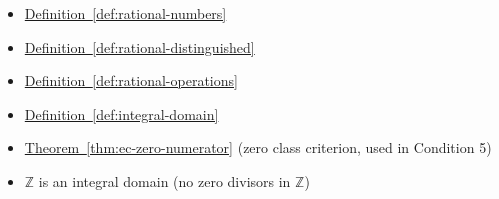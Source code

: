 \begin{dependencies}
\begin{itemize}
  \item \hyperref[def:rational-numbers]{Definition~\ref*{def:rational-numbers}}
  \item \hyperref[def:rational-distinguished]{Definition~\ref*{def:rational-distinguished}}
  \item \hyperref[def:rational-operations]{Definition~\ref*{def:rational-operations}}
  \item \hyperref[def:integral-domain]{Definition~\ref*{def:integral-domain}}
  \item \hyperref[thm:ec-zero-numerator]{Theorem~\ref*{thm:ec-zero-numerator}}
        \textnormal{(zero class criterion, used in Condition 5)}
  \item $\mathbb{Z}$ is an integral domain (no zero divisors in $\mathbb{Z}$)
\end{itemize}
\end{dependencies}

\clearpage
